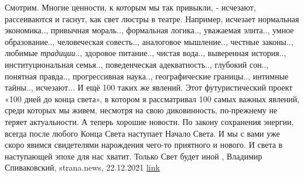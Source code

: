 Смотрим. Многие ценности, к которым мы так привыкли, - исчезают, рассеиваются и
гаснут, как свет люстры в театре.  Например, исчезает нормальная экономика..,
привычная мораль.., формальная логика.., уважаемая элита.., умное
образование.., человеческая совесть.., аналоговое мышление.., честные законы..,
любимые \emph{традиции}.., здоровое питание.., чистая вода.., выверенная
история.., институциональная семья.., поведенческая адекватность.., глубокий
сон.., понятная правда.., прогрессивная наука.., географические границы..,
интимные тайны.., исчезают...  И ещё 100 таких же явлений.  Этот
футуристический проект «100 дней до конца света», в котором я рассматривал 100
самых важных явлений, среди которых мы живем, несмотря на свою диковинность,
по-прежнему не теряет актуальности.  А теперь хорошие новости. По закону
сохранения энергии, всегда после любого Конца Света наступает Начало Света. И
мы с вами уже скоро явимся свидетелями нарождения чего-то приятного и нового.
И света в наступающей эпохе для нас хватит.  Только Свет будет иной
, 
Владимир Спиваковский, strana.news, 22.12.2021
\href{https://strana.news/opinions/368254-konets-sveta-nastupaet-postepenno-obvolakivaja-vsekh-nas.html}{link}
